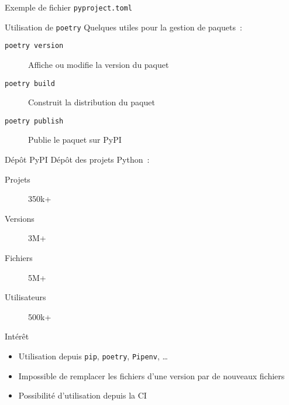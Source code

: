 \begin{frame}{Exemple de fichier \texttt{pyproject.toml}}
\end{frame}

\begin{frame}{Utilisation de \texttt{poetry}}
  Quelques  utiles pour la gestion de paquets~:
  \begin{description}
    \item[\texttt{poetry version}] Affiche ou modifie la version du paquet
    \item[\texttt{poetry build}] Construit la distribution du paquet
    \item[\texttt{poetry publish}] Publie le paquet sur PyPI
  \end{description}
\end{frame}

\begin{frame}{Dépôt PyPI}
  Dépôt des projets Python~:

  \begin{description}
    \item[Projets] 350k+
    \item[Versions] 3M+
    \item[Fichiers] 5M+
    \item[Utilisateurs] 500k+
  \end{description}
\end{frame}

\begin{frame}{Intérêt}
  \begin{itemize}
    \item Utilisation depuis \texttt{pip}, \texttt{poetry}, \texttt{Pipenv}, …
    \item Impossible de remplacer les fichiers d'une version par de nouveaux fichiers
    \item Possibilité d'utilisation depuis la CI
  \end{itemize}
\end{frame}
